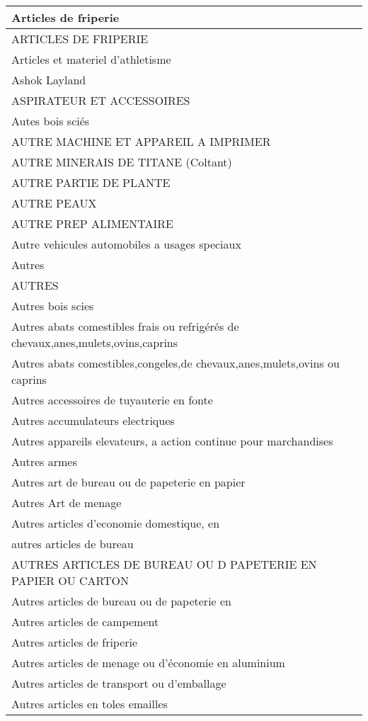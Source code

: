 \documentclass[
]{book}
\begin{document}
\begin{table}
\begin{tabular}[t]{l}
\hline
Articles de friperie\\
\hline
ARTICLES DE FRIPERIE\\
\hline
Articles et materiel d'athletisme\\
\hline
Ashok Layland\\
\hline
ASPIRATEUR ET ACCESSOIRES\\
\hline
Autes bois sciés\\
\hline
AUTRE MACHINE ET APPAREIL A IMPRIMER\\
\hline
AUTRE MINERAIS DE TITANE (Coltant)\\
\hline
AUTRE PARTIE DE PLANTE\\
\hline
AUTRE PEAUX\\
\hline
AUTRE PREP ALIMENTAIRE\\
\hline
Autre vehicules automobiles a usages speciaux\\
\hline
Autres\\
\hline
AUTRES\\
\hline
Autres  bois scies\\
\hline
Autres abats comestibles frais ou refrigérés de chevaux,anes,mulets,ovins,caprins\\
\hline
Autres abats comestibles,congeles,de chevaux,anes,mulets,ovins ou caprins\\
\hline
Autres accessoires de tuyauterie en fonte\\
\hline
Autres accumulateurs electriques\\
\hline
Autres appareils elevateurs, a action continue pour marchandises\\
\hline
Autres armes\\
\hline
Autres art de bureau ou de papeterie en papier\\
\hline
Autres Art de menage\\
\hline
Autres articles d'economie domestique, en\\
\hline
autres articles de bureau\\
\hline
AUTRES ARTICLES DE BUREAU OU D PAPETERIE EN PAPIER OU CARTON\\
\hline
Autres articles de bureau ou de papeterie en\\
\hline
Autres articles de campement\\
\hline
Autres articles de friperie\\
\hline
Autres articles de menage ou d'économie en aluminium\\
\hline
Autres articles de transport ou d'emballage\\
\hline
Autres articles en toles emailles\\

\end{tabular}
\end{table}
\end{document}
